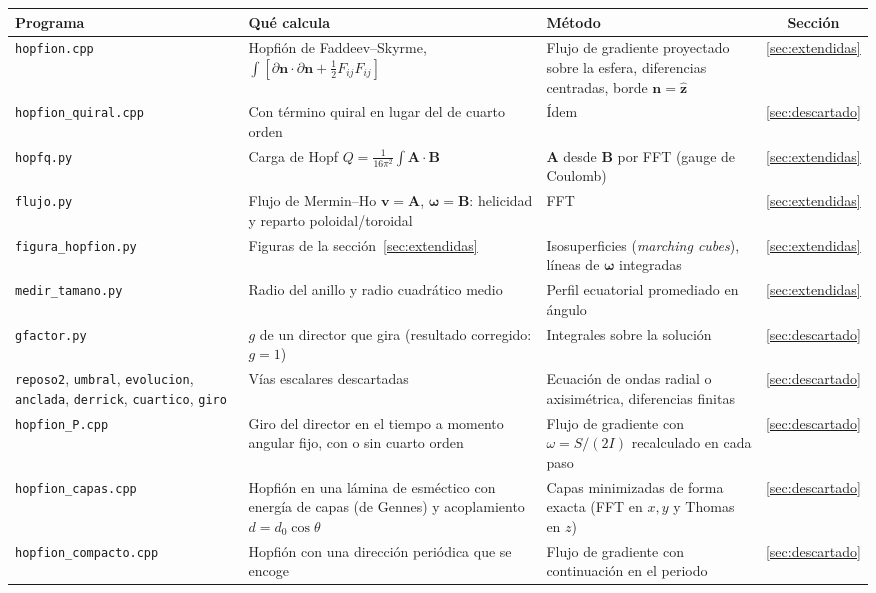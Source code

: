 \documentclass[11pt,a4paper]{article}
\newcommand{\vb}[1]{\symbf{#1}}
\newcommand{\prog}[1]{\texttt{#1}}
\begin{document}
\begin{center}
\small
\begin{tabularx}{\textwidth}{@{}>{\raggedright\arraybackslash}p{} Y Y c@{}}
\toprule
Programa & Qué calcula & Método & Sección \\
\midrule
\prog{hopfion.cpp} & Hopfión de Faddeev--Skyrme, $\int[\partial\vb{n}\cdot\partial\vb{n}+\tfrac12F_{ij}F_{ij}]$ & Flujo de gradiente proyectado sobre la esfera, diferencias centradas, borde $\vb{n}=\hat{\vb{z}}$ & \ref{sec:extendidas} \\
\addlinespace
\prog{hopfion\_quiral.cpp} & Con término quiral en lugar del de cuarto orden & Ídem & \ref{sec:descartado} \\
\addlinespace
\prog{hopfq.py} & Carga de Hopf $Q=\frac{1}{16\pi^2}\int\vb{A}\cdot\vb{B}$ & $\vb{A}$ desde $\vb{B}$ por FFT (gauge de Coulomb) & \ref{sec:extendidas} \\
\addlinespace
\prog{flujo.py} & Flujo de Mermin--Ho $\vb{v}=\vb{A}$, $\vb{\omega}=\vb{B}$: helicidad y reparto poloidal/toroidal & FFT & \ref{sec:extendidas} \\
\addlinespace
\prog{figura\_hopfion.py} & Figuras de la sección~\ref{sec:extendidas} & Isosuperficies (\emph{marching cubes}), líneas de $\vb{\omega}$ integradas & \ref{sec:extendidas} \\
\addlinespace
\prog{medir\_tamano.py} & Radio del anillo y radio cuadrático medio & Perfil ecuatorial promediado en ángulo & \ref{sec:extendidas} \\
\addlinespace
\prog{gfactor.py} & $g$ de un director que gira (resultado corregido: $g=1$) & Integrales sobre la solución & \ref{sec:descartado} \\
\addlinespace
\prog{reposo2}, \prog{umbral}, \prog{evolucion}, \prog{anclada}, \prog{derrick}, \prog{cuartico}, \prog{giro} & Vías escalares descartadas & Ecuación de ondas radial o axisimétrica, diferencias finitas & \ref{sec:descartado} \\
\addlinespace
\prog{hopfion\_P.cpp} & Giro del director en el tiempo a momento angular fijo, con o sin cuarto orden & Flujo de gradiente con $\omega=S/(2I)$ recalculado en cada paso & \ref{sec:descartado} \\
\addlinespace
\prog{hopfion\_capas.cpp} & Hopfión en una lámina de esméctico con energía de capas (de Gennes) y acoplamiento $d=d_0\cos\theta$ & Capas minimizadas de forma exacta (FFT en $x,y$ y Thomas en $z$) & \ref{sec:descartado} \\
\addlinespace
\prog{hopfion\_compacto.cpp} & Hopfión con una dirección periódica que se encoge & Flujo de gradiente con continuación en el periodo & \ref{sec:descartado} \\

\end{tabularx}
\end{center}
\end{document}
